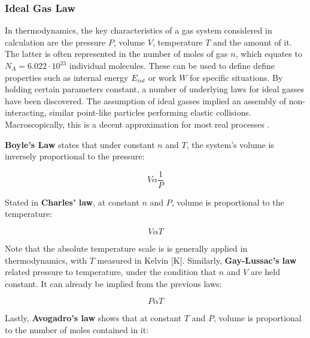\subsubsection{Ideal Gas Law}
\label{Ideal Gas Law}

In thermodynamics, the key characteristics of a gas system considered in calculation are the pressure $\mathit{P}$, volume $\mathit{V}$, temperature $\mathit{T}$ and the amount of it. The latter is often represented in the number of moles of gas $\mathit{n}$, which equates to $\mathit{N_A = 6.022 \cdot 10^{23}}$ individual molecules. These can be used to define define properties such as internal energy $\mathit{E_{int}}$ or work $\mathit{W}$ for specific situations. By holding certain parameters constant, a number of underlying laws for ideal gasses have been discovered. The assumption of ideal gasses implied an assembly of non-interacting, similar point-like particles performing elastic collisions. Macroscopically, this is a decent approximation for most real processes \cite[pp.~391-395]{Brown}. 

\textbf{Boyle's Law} states that under constant $\mathit{n}$ and $\mathit{T}$, the system's volume is inversely proportional to the pressure: 

\begin{equation}
\label{eq:Boyle's Law}
    \mathit{V \alpha \frac{1}{P}}
\end{equation}

Stated in \textbf{Charles' law}, at constant $\mathit{n}$ and $\mathit{P}$, volume is proportional to the temperature: 

\begin{equation}
\label{eq:Charles' Law}
    \mathit{V \alpha T}
\end{equation}

Note that the absolute temperature scale is is generally applied in thermodynamics, with $\mathit{T}$ measured in Kelvin [K]. Similarly, \textbf{Gay-Lussac's law} related pressure to temperature, under the condition that $\mathit{n}$ and $\mathit{V}$ are held constant. It can already be implied from the previous laws: \cite[pp.~387-391]{Brown}

\begin{equation}
\label{eq:Gay-Lussac's Law}
    \mathit{P \alpha T}
\end{equation}

Lastly, \textbf{Avogadro's law} shows that at constant $\mathit{T}$ and $\mathit{P}$, volume is proportional to the number of moles contained in it: \cite[pp.~387-391]{Brown}

